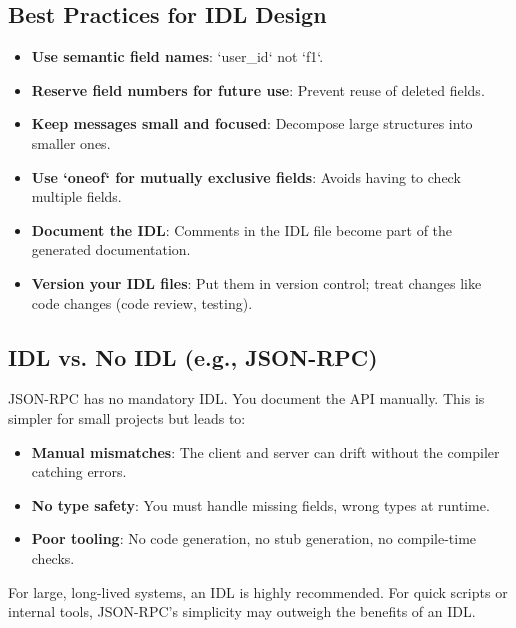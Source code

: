 \documentclass[10pt,a4paper]{article}
\begin{document}
\subsection{Best Practices for IDL Design}
\begin{itemize}
    \item \textbf{Use semantic field names}: `user\_id` not `f1`.
    \item \textbf{Reserve field numbers for future use}: Prevent reuse of deleted fields.
    \item \textbf{Keep messages small and focused}: Decompose large structures into smaller ones.
    \item \textbf{Use `oneof` for mutually exclusive fields}: Avoids having to check multiple fields.
    \item \textbf{Document the IDL}: Comments in the IDL file become part of the generated documentation.
    \item \textbf{Version your IDL files}: Put them in version control; treat changes like code changes (code review, testing).
\end{itemize}

\subsection{IDL vs. No IDL (e.g., JSON-RPC)}
JSON-RPC has no mandatory IDL. You document the API manually. This is simpler for small projects but leads to:
\begin{itemize}
    \item \textbf{Manual mismatches}: The client and server can drift without the compiler catching errors.
    \item \textbf{No type safety}: You must handle missing fields, wrong types at runtime.
    \item \textbf{Poor tooling}: No code generation, no stub generation, no compile-time checks.
\end{itemize}
For large, long-lived systems, an IDL is highly recommended. For quick scripts or internal tools, JSON-RPC’s simplicity may outweigh the benefits of an IDL.
\end{document}
